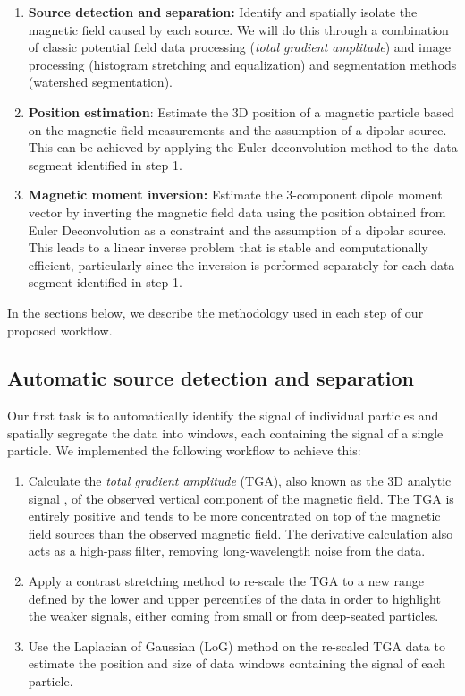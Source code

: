 \begin{enumerate}
\item \textbf{Source detection and separation:} Identify and spatially isolate
  the magnetic field caused by each source. We will do this through a
  combination of classic potential field data processing (\textit{total
  gradient amplitude}) and image processing (histogram stretching and
  equalization) and segmentation methods (watershed segmentation).
\item \textbf{Position estimation}: Estimate the 3D position of a magnetic
  particle based on the magnetic field measurements and the assumption of a
  dipolar source. This can be achieved by applying the Euler deconvolution
  method to the data segment identified in step 1.
\item \textbf{Magnetic moment inversion:} Estimate the 3-component dipole
  moment vector by inverting the magnetic field data using the position
  obtained from Euler Deconvolution as a constraint and the assumption of a
  dipolar source. This leads to a linear inverse problem that is stable and
  computationally efficient, particularly since the inversion is performed
  separately for each data segment identified in step 1.
\end{enumerate}

In the sections below, we describe the methodology used in each step of our
proposed workflow.

\subsection{Automatic source detection and separation}

Our first task is to automatically identify the signal of individual particles
and spatially segregate the data into windows, each containing the signal of a
single particle. We implemented the following workflow to achieve this:

\begin{enumerate}
\item Calculate the \textit{total gradient amplitude} (TGA), also known as the 3D analytic signal \citep{Roest1992Magnetic}, of the observed vertical   component of the magnetic field. The TGA is entirely positive and tends to be more concentrated on top of the magnetic field sources than the observed magnetic field. The derivative calculation also acts as a high-pass filter, removing long-wavelength noise from the data.
\item Apply a contrast stretching method to re-scale the TGA to a new range defined by the lower and upper percentiles of the data in order to highlight the weaker signals, either coming from small or from deep-seated particles.
\item Use the Laplacian of Gaussian (LoG) method \citep{VanderWalt2014} on the re-scaled TGA data to estimate the position and size of data windows containing the signal of each particle.
\end{enumerate}

